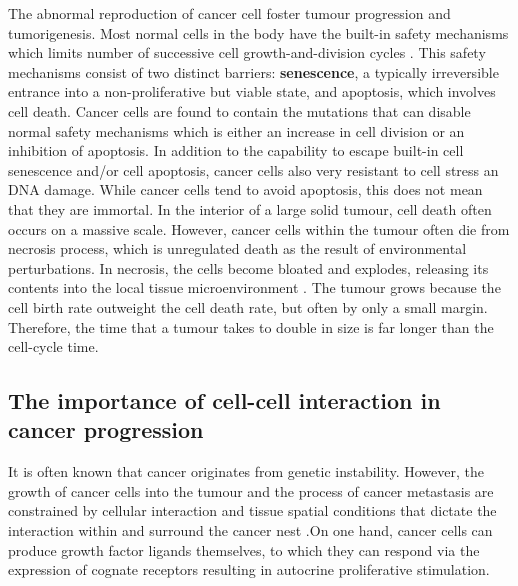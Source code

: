 The abnormal reproduction of cancer cell foster tumour progression and tumorigenesis. Most normal cells in the body have the built-in safety mechanisms which limits number of successive cell growth-and-division cycles \cite{hanahan2000hallmarks, hanahan2011hallmarksnext}. This safety mechanisms consist of two distinct barriers: \textbf{senescence}, a typically irreversible entrance into a non-proliferative but viable state, and apoptosis, which involves cell death. Cancer cells are found to contain the mutations that can disable normal safety mechanisms which is either an increase in cell division or an inhibition of apoptosis. In addition to the capability to escape built-in cell senescence and/or cell apoptosis, cancer cells also very resistant to cell stress an DNA damage. While cancer cells tend to avoid apoptosis, this does not mean that they are immortal. In the interior of a large solid tumour, cell death often occurs on a massive scale. However, cancer cells within the tumour often die from necrosis process, which is unregulated death as the result of environmental perturbations. In necrosis, the cells become bloated and explodes, releasing its contents into the local tissue microenvironment \cite{hanahan2011hallmarksnext}. The tumour grows because the cell birth rate outweight the cell death rate, but often by only a small margin. Therefore, the time that a tumour takes to double in size is far longer than the cell-cycle time.


\subsection{The importance of cell-cell interaction in cancer progression}
It is often known that cancer originates from genetic instability. However, the growth of cancer cells into the tumour and the process of cancer metastasis are constrained by cellular interaction and tissue spatial conditions that dictate the interaction within and surround the cancer nest \cite{west2019cellular, liotta2001microenvironment,anderson2006tumor}.On one hand, cancer cells can produce growth factor ligands themselves, to which they can respond via the expression of cognate receptors resulting in autocrine proliferative stimulation. 

